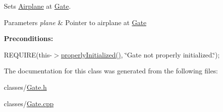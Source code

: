 Sets \mbox{\hyperlink{class_airplane}{Airplane}} at \mbox{\hyperlink{class_gate}{Gate}}. 


\begin{DoxyParams}{Parameters}
{\em plane} & Pointer to airplane at \mbox{\hyperlink{class_gate}{Gate}}\\
\hline
\end{DoxyParams}
{\bfseries Preconditions\+:}
\begin{DoxyItemize}
\item R\+E\+Q\+U\+I\+RE(this-\/$>$\mbox{\hyperlink{class_gate_a51a6794e1e26f03c75f469a6ee8d3432}{properly\+Initialized()}}, \char`\"{}\+Gate not properly initialized.\char`\"{}); 
\end{DoxyItemize}

The documentation for this class was generated from the following files\+:\begin{DoxyCompactItemize}
\item 
classes/\mbox{\hyperlink{_gate_8h}{Gate.\+h}}\item 
classes/\mbox{\hyperlink{_gate_8cpp}{Gate.\+cpp}}\end{DoxyCompactItemize}
